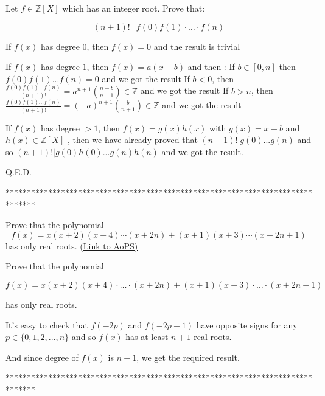 \begin{solution}
	\begin{tcolorbox}Let $f\in \mathbb{Z}[X]$ which has an integer root. Prove that:

\[(n+1)!\ |\ f(0)f(1)\cdot \ldots \cdot f(n)\]\end{tcolorbox}
If $f(x)$ has degree $0$, then $f(x)=0$ and the result is trivial

If $f(x)$ has degree $1$, then $f(x)=a(x-b)$ and then :
If $b\in[0,n]$ then $f(0)f(1)...f(n)=0$ and we got the result
If $b<0$, then $\frac{f(0)f(1)...f(n)}{(n+1)!}=a^{n+1}\binom{n-b}{n+1}\in\mathbb Z$ and we got the result
If $b>n$, then $\frac{f(0)f(1)...f(n)}{(n+1)!}=(-a)^{n+1}\binom{b}{n+1}\in\mathbb Z$ and we got the result

If $f(x)$ has degree $>1$, then $f(x)=g(x)h(x)$ with $g(x)=x-b$ and $h(x)\in\mathbb Z[X]$ , then we have already proved that $(n+1)!|g(0)...g(n)$ and so $(n+1)!|g(0)h(0)...g(n)h(n)$ and we got the result.

Q.E.D.
\end{solution}
*******************************************************************************
-------------------------------------------------------------------------------

\begin{problem}
	Prove that the polynomial
\[f(x)=x(x+2)(x+4)\cdots (x+2n)+(x+1)(x+3)\cdots (x+2n+1)\]
has only real roots.
	\flushright \href{https://artofproblemsolving.com/community/c6h395008}{(Link to AoPS)}
\end{problem}



\begin{solution}
	\begin{tcolorbox}Prove that the polynomial

\[f(x)=x(x+2)(x+4)\cdot \ldots \cdot (x+2n)+(x+1)(x+3)\cdot \ldots \cdot (x+2n+1)\]

has only real roots.\end{tcolorbox}
It's easy to check that $f(-2p)$ and $f(-2p-1)$ have opposite signs for any $p\in\{0,1,2,...,n\}$ and so $f(x)$ has at least $n+1$ real roots.

And since degree of $f(x)$ is $n+1$, we get the required result.
\end{solution}
*******************************************************************************
-------------------------------------------------------------------------------

